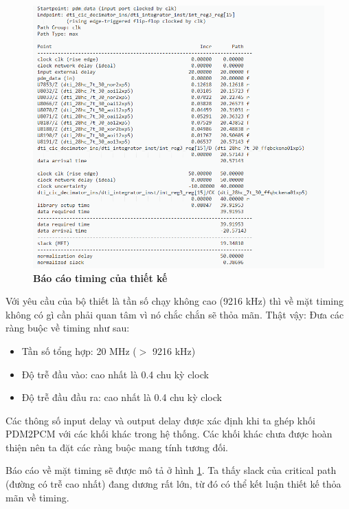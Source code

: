 \begin{figure}[H]
    \centering
    \includegraphics[width=12cm]{Images/Chuong5/syn/timing.png}
    \caption[Báo cáo timing của thiết kế]{\bfseries \fontsize{12pt}{0pt}\selectfont Báo cáo timing của thiết kế}
    \label{syn_t}
\end{figure}

Với yêu cầu của bộ thiết là tần số chạy không cao (9216 kHz) thì về mặt timing không có gì cần phải quan tâm vì nó chắc chắn sẽ thỏa mãn. Thật vậy:
Đưa các ràng buộc về timing như sau:
\begin{itemize}
    \item Tần số tổng hợp: 20 MHz ($>$ 9216 kHz)
    \item Độ trễ đầu vào: cao nhất là 0.4 chu kỳ clock
    \item Độ trễ đầu đầu ra: cao nhất là 0.4 chu kỳ clock
\end{itemize}

Các thông số input delay và output delay được xác định khi ta ghép khối PDM2PCM 
với các khối khác trong hệ thống. Các khối khác chưa được hoàn thiện nên ta đặt các ràng buộc mang tính tương đối.

Báo cáo về mặt timing sẽ được mô tả ở hình \ref{syn_t}. Ta thấy slack của critical path (đường có trễ cao nhất) đang dương rất lớn, từ đó có thể kết luận thiết kế thỏa mãn về timing.
